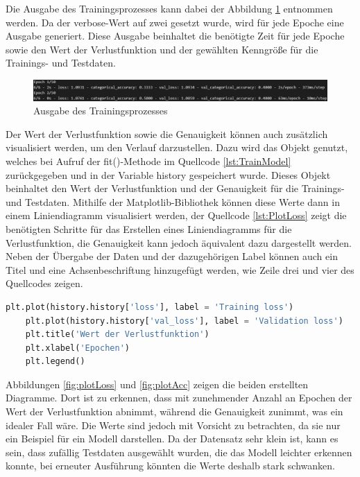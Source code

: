 Die Ausgabe des Trainingsprozesses kann dabei der Abbildung \ref*{fig:TrainModel} entnommen werden. Da der \glqq verbose\grqq{}-Wert auf zwei gesetzt wurde, wird für jede Epoche eine Ausgabe
generiert. Diese Ausgabe beinhaltet die benötigte Zeit für jede Epoche sowie den Wert der Verlustfunktion und der gewählten Kenngröße für die Trainings- und Testdaten.
\begin{figure}[H]
    \centering
    \includegraphics[width = \textwidth]{abbildungen/TrainAusgabe.png}
    \caption{Ausgabe des Trainingsprozesses}
    \label{fig:TrainModel}
\end{figure}
Der Wert der Verlustfunktion sowie die Genauigkeit können auch zusätzlich visualisiert werden, um den Verlauf darzustellen. Dazu wird das Objekt genutzt, welches bei Aufruf der 
fit()-Methode im Quellcode \ref*{lst:TrainModel} zurückgegeben und in der Variable \glqq history\grqq{} gespeichert wurde. Dieses Objekt beinhaltet 
den Wert der Verlustfunktion und der Genauigkeit für die Trainings- und Testdaten. Mithilfe der Matplotlib-Bibliothek können diese Werte dann in einem Liniendiagramm visualisiert werden,
der Quellcode \ref*{lst:PlotLoss} zeigt die benötigten Schritte für das Erstellen eines Liniendiagramms für die Verlustfunktion, die Genauigkeit kann jedoch äquivalent dazu 
dargestellt werden. Neben der Übergabe der Daten und der dazugehörigen Label können auch ein Titel und eine Achsenbeschriftung hinzugefügt werden, wie Zeile drei und vier des Quellcodes zeigen.
\begin{lstlisting}[language = python, caption={Trainieren des Modells},captionpos=b, label = lst:PlotLoss, float, floatplacement=H]
    plt.plot(history.history['loss'], label = 'Training loss')
    plt.plot(history.history['val_loss'], label = 'Validation loss')
    plt.title('Wert der Verlustfunktion')
    plt.xlabel('Epochen')
    plt.legend()
\end{lstlisting}
Abbildungen \ref*{fig:plotLoss} und \ref*{fig:plotAcc} zeigen die beiden erstellten Diagramme. Dort ist zu erkennen, dass mit zunehmender Anzahl an Epochen der Wert der Verlustfunktion abnimmt,
während die Genauigkeit zunimmt, was ein idealer Fall wäre. Die Werte sind jedoch mit Vorsicht zu betrachten, da sie nur ein Beispiel für ein Modell darstellen.
Da der Datensatz sehr klein ist, kann es sein, dass zufällig Testdaten ausgewählt wurden, die das Modell leichter erkennen konnte, bei erneuter Ausführung könnten die 
Werte deshalb stark schwanken.

